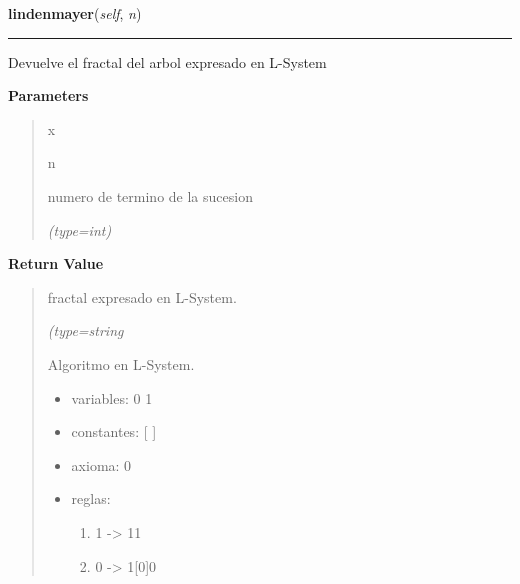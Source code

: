 \hspace{.8\funcindent}\begin{boxedminipage}{\funcwidth}

    \raggedright \textbf{lindenmayer}(\textit{self}, \textit{n})

    \vspace{-1.5ex}

    \rule{\textwidth}{0.5\fboxrule}
\setlength{\parskip}{2ex}
    Devuelve el fractal del arbol expresado en L-System

\setlength{\parskip}{1ex}
      \textbf{Parameters}
      \vspace{-1ex}

      \begin{quote}
        \begin{Ventry}{x}

          \item[n]

          numero de termino de la sucesion

            {\it (type=int)}

        \end{Ventry}

      \end{quote}

      \textbf{Return Value}
    \vspace{-1ex}

      \begin{quote}
      fractal expresado en L-System.

      {\it (type=string

      Algoritmo en L-System.

      \begin{itemize}
      \setlength{\parskip}{0.6ex}
        \item variables: 0 1

        \item constantes: [ ]

        \item axioma: 0

        \item reglas:

          \begin{enumerate}

          \setlength{\parskip}{0.5ex}
            \item 1 -{\textgreater} 11

            \item 0 -{\textgreater} 1[0]0


\end{enumerate}
\end{itemize}}
\end{quote}
\end{boxedminipage}
